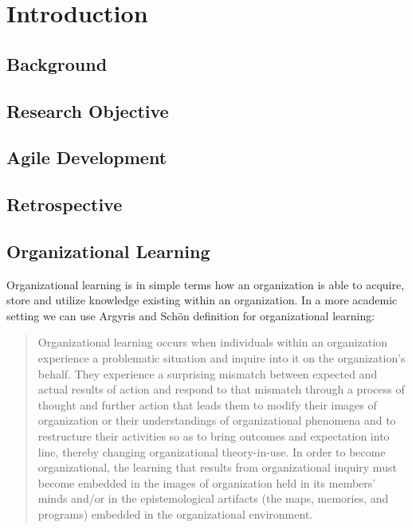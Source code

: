 \chapter{Introduction}
\section{Background}
\section{Research Objective}
\section{Agile Development}
\section{Retrospective}
\section{Organizational Learning}
Organizational learning is in simple terms how an organization is able to acquire, store and utilize knowledge existing within an organization. In a more academic setting we can use Argyris and Schön definition \cite{Argyris1996} for organizational learning: 

\begin{quote}
	Organizational learning occurs when individuals within an organization experience a problematic situation and inquire into it on the organization's behalf. They experience a surprising mismatch between expected and actual results of action and respond to that mismatch through a process of thought and further action that leads them to modify their images of organization or their understandings of organizational phenomena and to restructure their activities so as to bring outcomes and expectation into line, thereby changing organizational theory-in-use. In order to become organizational, the learning that results from organizational inquiry must become embedded in the images of organization held in its members' minds and/or in the epistemological artifacts (the maps, memories, and programs) embedded in the organizational environment. 
\end{quote}

